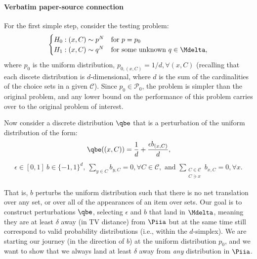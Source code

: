 \documentclass[10pt]{article}
\begin{document}
\paragraph{Verbatim paper-source connection}
\begin{ReviewVerbatim}
For the first simple step, consider the testing problem:
	\begin{align}
	\label{eq:test2}
	\begin{cases}
	H_0: (x, C) \sim p^N & \text{for } p = p_0 \\
	H_1: (x,C) \sim q^N & \text{for some unknown } q \in \Mdelta,
	\end{cases}
	\end{align}
	where $p_0$ is the uniform distribution, $p_{0,(x,C)} = 1/d, \forall (x,C)$ (recalling that each discete distribution is $d$-dimensional, where $d$ is the sum of the cardinalities of the choice sets in a given $\mathcal C$). Since $p_0 \in \mathcal{P}_0$, the problem is simpler than the original problem, and any lower bound on the performance of this problem carries over to the original problem of interest.

	Now consider a discrete distribution $\qbe$ that is a perturbation of the uniform distribution of the form:
	\begin{align*}
	\qbe((x,C)) = \frac{1}{d} + \frac{\epsilon b_{(x,C)}}{d},
	\end{align*}
	\begin{align*}
	\epsilon \in [0,1] \
	b \in \lbrace -1, 1 \rbrace^d,
	\
	\sum_{y \in C} b_{y,C} = 0, \forall C \in \mathcal C,
	\text{ and }
	\sum_{\substack{C \in \mathcal{C}\\ C \ni x}} b_{x,C} = 0, \forall x.
	\end{align*}

	That is, $b$ perturbs the uniform distribution such that there is no net translation over any set, or over all of the appearances of an item over sets. Our goal is to construct perturbations $\qbe$, selecting $\epsilon$ and $b$ that land in $\Mdelta$, meaning they are at least $\delta$ away (in TV distance) from $\Piia$ but at the same time still correspond to valid probability distributions (i.e., within the $d$-simplex). We are starting our journey (in the direction of $b$) at the uniform distribution $p_0$, and we want to show that we always land at least $\delta$ away from {\it any} distribution in $\Piia$.


\end{ReviewVerbatim}
\end{document}

